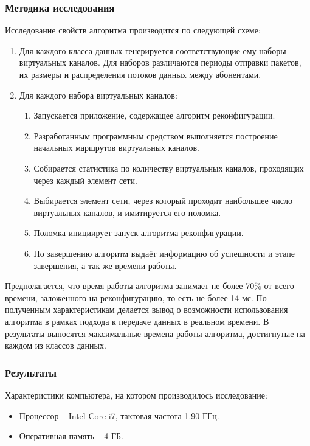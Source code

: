 \documentclass[12pt, a4paper]{article}
\begin{document}
\subsubsection{Методика исследования}
Исследование свойств алгоритма производится по следующей схеме:
\begin{enumerate}
	\item Для каждого класса данных генерируется соответствующие ему наборы виртуальных каналов. Для наборов различаются периоды отправки пакетов, их размеры и распределения потоков данных между абонентами.
	\item Для каждого набора виртуальных каналов:
	\begin{enumerate}
		\item Запускается приложение, содержащее алгоритм реконфигурации.
		\item Разработанным программным средством выполняется построение начальных маршрутов виртуальных каналов.
		\item Собирается статистика по количеству виртуальных каналов, проходящих через каждый элемент сети.
		\item Выбирается элемент сети, через который проходит наибольшее число виртуальных каналов, и имитируется его поломка.
		\item Поломка инициирует запуск алгоритма реконфигурации.
		\item По завершению алгоритм выдаёт информацию об успешности и этапе завершения, а так же времени работы.
	\end{enumerate}
\end{enumerate}

Предполагается, что время работы алгоритма занимает не более 70\% от всего времени, заложенного на реконфигурацию, то есть не более 14 мс. По полученным характеристикам делается вывод о возможности использования алгоритма в рамках подхода к передаче данных в реальном времени. В результаты выносятся максимальные времена работы алгоритма, достигнутые на каждом из классов данных.
 
\subsubsection{Результаты}
Характеристики компьютера, на котором производилось исследование:
\begin{itemize}
	\item Процессор -- Intel Core i7, тактовая частота 1.90 ГГц.
	\item Оперативная память -- 4 ГБ.
\end{itemize}
\end{document}
